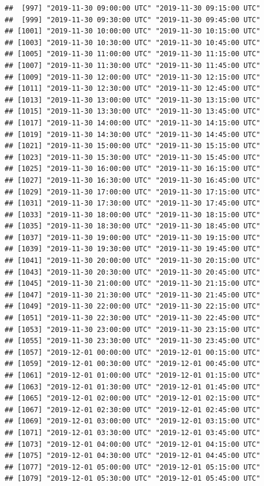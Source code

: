 \documentclass{article}\usepackage[]{graphicx}\usepackage[]{color}
\makeatletter
\newenvironment{kframe}{%
 \def\at@end@of@kframe{}%
 \ifinner\ifhmode%
  \def\at@end@of@kframe{\end{minipage}}%
  \begin{minipage}{\columnwidth}%
 \fi\fi%
 \def\FrameCommand##1{\hskip\@totalleftmargin \hskip-\fboxsep
 \colorbox{shadecolor}{##1}\hskip-\fboxsep
     \hskip-\linewidth \hskip-\@totalleftmargin \hskip\columnwidth}%
 \MakeFramed {\advance\hsize-\width
   \@totalleftmargin\z@ \linewidth\hsize
   \@setminipage}}%
 {\par\unskip\endMakeFramed%
 \at@end@of@kframe}
\newenvironment{knitrout}{}{} %
\makeatother
\begin{document}
\begin{knitrout}
\begin{kframe}
\begin{verbatim}
##  [997] "2019-11-30 09:00:00 UTC" "2019-11-30 09:15:00 UTC"
##  [999] "2019-11-30 09:30:00 UTC" "2019-11-30 09:45:00 UTC"
## [1001] "2019-11-30 10:00:00 UTC" "2019-11-30 10:15:00 UTC"
## [1003] "2019-11-30 10:30:00 UTC" "2019-11-30 10:45:00 UTC"
## [1005] "2019-11-30 11:00:00 UTC" "2019-11-30 11:15:00 UTC"
## [1007] "2019-11-30 11:30:00 UTC" "2019-11-30 11:45:00 UTC"
## [1009] "2019-11-30 12:00:00 UTC" "2019-11-30 12:15:00 UTC"
## [1011] "2019-11-30 12:30:00 UTC" "2019-11-30 12:45:00 UTC"
## [1013] "2019-11-30 13:00:00 UTC" "2019-11-30 13:15:00 UTC"
## [1015] "2019-11-30 13:30:00 UTC" "2019-11-30 13:45:00 UTC"
## [1017] "2019-11-30 14:00:00 UTC" "2019-11-30 14:15:00 UTC"
## [1019] "2019-11-30 14:30:00 UTC" "2019-11-30 14:45:00 UTC"
## [1021] "2019-11-30 15:00:00 UTC" "2019-11-30 15:15:00 UTC"
## [1023] "2019-11-30 15:30:00 UTC" "2019-11-30 15:45:00 UTC"
## [1025] "2019-11-30 16:00:00 UTC" "2019-11-30 16:15:00 UTC"
## [1027] "2019-11-30 16:30:00 UTC" "2019-11-30 16:45:00 UTC"
## [1029] "2019-11-30 17:00:00 UTC" "2019-11-30 17:15:00 UTC"
## [1031] "2019-11-30 17:30:00 UTC" "2019-11-30 17:45:00 UTC"
## [1033] "2019-11-30 18:00:00 UTC" "2019-11-30 18:15:00 UTC"
## [1035] "2019-11-30 18:30:00 UTC" "2019-11-30 18:45:00 UTC"
## [1037] "2019-11-30 19:00:00 UTC" "2019-11-30 19:15:00 UTC"
## [1039] "2019-11-30 19:30:00 UTC" "2019-11-30 19:45:00 UTC"
## [1041] "2019-11-30 20:00:00 UTC" "2019-11-30 20:15:00 UTC"
## [1043] "2019-11-30 20:30:00 UTC" "2019-11-30 20:45:00 UTC"
## [1045] "2019-11-30 21:00:00 UTC" "2019-11-30 21:15:00 UTC"
## [1047] "2019-11-30 21:30:00 UTC" "2019-11-30 21:45:00 UTC"
## [1049] "2019-11-30 22:00:00 UTC" "2019-11-30 22:15:00 UTC"
## [1051] "2019-11-30 22:30:00 UTC" "2019-11-30 22:45:00 UTC"
## [1053] "2019-11-30 23:00:00 UTC" "2019-11-30 23:15:00 UTC"
## [1055] "2019-11-30 23:30:00 UTC" "2019-11-30 23:45:00 UTC"
## [1057] "2019-12-01 00:00:00 UTC" "2019-12-01 00:15:00 UTC"
## [1059] "2019-12-01 00:30:00 UTC" "2019-12-01 00:45:00 UTC"
## [1061] "2019-12-01 01:00:00 UTC" "2019-12-01 01:15:00 UTC"
## [1063] "2019-12-01 01:30:00 UTC" "2019-12-01 01:45:00 UTC"
## [1065] "2019-12-01 02:00:00 UTC" "2019-12-01 02:15:00 UTC"
## [1067] "2019-12-01 02:30:00 UTC" "2019-12-01 02:45:00 UTC"
## [1069] "2019-12-01 03:00:00 UTC" "2019-12-01 03:15:00 UTC"
## [1071] "2019-12-01 03:30:00 UTC" "2019-12-01 03:45:00 UTC"
## [1073] "2019-12-01 04:00:00 UTC" "2019-12-01 04:15:00 UTC"
## [1075] "2019-12-01 04:30:00 UTC" "2019-12-01 04:45:00 UTC"
## [1077] "2019-12-01 05:00:00 UTC" "2019-12-01 05:15:00 UTC"
## [1079] "2019-12-01 05:30:00 UTC" "2019-12-01 05:45:00 UTC"

\end{verbatim}
\end{kframe}
\end{knitrout}
\end{document}
